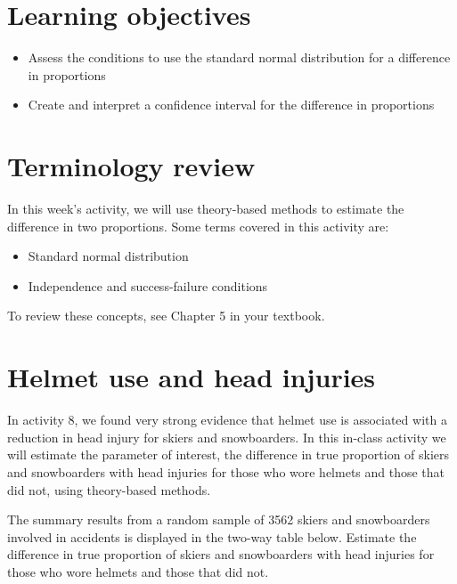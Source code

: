\documentclass[
]{report}
\begin{document}
\hypertarget{learning-objectives}{%
\section{Learning objectives}\label{learning-objectives}}

\begin{itemize}
\item
  Assess the conditions to use the standard normal distribution for a difference in proportions
\item
  Create and interpret a confidence interval for the difference in proportions
\end{itemize}

\hypertarget{terminology-review}{%
\section{Terminology review}\label{terminology-review}}

In this week's activity, we will use theory-based methods to estimate the difference in two proportions. Some terms covered in this activity are:

\begin{itemize}
\item
  Standard normal distribution
\item
  Independence and success-failure conditions
\end{itemize}

To review these concepts, see Chapter 5 in your textbook.

\hypertarget{helmet-use-and-head-injuries}{%
\section{Helmet use and head injuries}\label{helmet-use-and-head-injuries}}

In activity 8, we found very strong evidence that helmet use is associated with a reduction in head injury for skiers and snowboarders. In this in-class activity we will estimate the parameter of interest, the difference in true proportion of skiers and snowboarders with head injuries for those who wore helmets and those that did not, using theory-based methods.

The summary results from a random sample of 3562 skiers and snowboarders involved in accidents is displayed in the two-way table below. Estimate the difference in true proportion of skiers and snowboarders with head injuries for those who wore helmets and those that did not.
\end{document}

